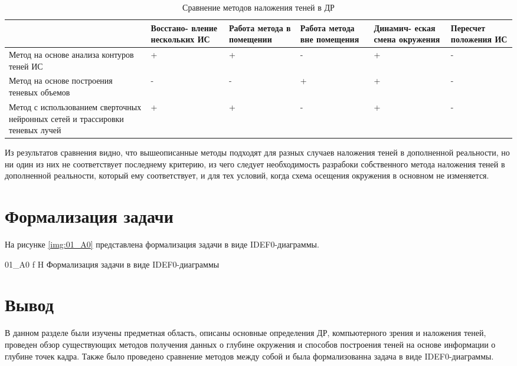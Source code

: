 \begin{table}[H]
	\caption{Сравнение методов наложения теней в ДР}
	\label{class}
	\begin{center}
		\begin{tabular}{| p{4 cm} | p{2 cm} | p{2 cm} | p{2 cm} | p{2 cm} | p{2 cm} |} 
			\hline
			& Восстано- вление нескольких ИС & Работа метода в помещении & Работа метода вне помещения & Динамич- еская смена окружения & Пересчет положения ИС \\
			\hline
			Метод на основе анализа контуров теней ИС & + & + & - & + & - \\
			\hline
			Метод на основе построения теневых объемов & - & - & + & + & - \\
			\hline
			Метод с использованием сверточных нейронных сетей и трассировки теневых лучей & + & + & - & + & - \\
			\hline
		\end{tabular}
	\end{center}
\end{table}

Из результатов сравнения видно, что вышеописанные методы подходят для разных случаев наложения теней в дополненной реальности, но ни один из них не соответствует последнему критерию, из чего следует необходимость разрабоки собственного метода наложения теней в дополненной реальности, который ему соответствует, и для тех условий, когда схема осещения окружения в основном не изменяется.

\section{Формализация задачи}

На рисунке \ref{img:01_A0} представлена формализация задачи в виде IDEF0-диаграммы.

{01_A0}
{f}
{H}
{\textwidth}
{Формализация задачи в виде IDEF0-диаграммы}

\section*{Вывод}

В данном разделе были изучены предметная область, описаны основные определения ДР, компьютерного зрения и наложения теней, проведен обзор существующих методов получения данных о глубине окружения и способов построения теней на основе информации о глубине точек кадра. Также было проведено сравнение методов между собой и была формализованна задача в виде IDEF0-диаграммы.